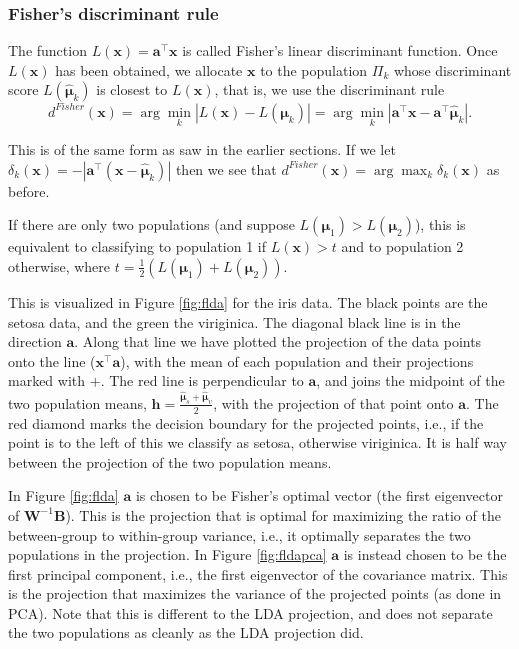 \documentclass[
]{book}
\theoremstyle{definition}
\theoremstyle{definition}
\theoremstyle{definition}
\theoremstyle{definition}
\theoremstyle{remark}
\begin{document}
\hypertarget{fishers-discriminant-rule}{%
\subsubsection*{Fisher's discriminant rule}\label{fishers-discriminant-rule}}

The function \(L(\mathbf x)=\mathbf a^\top \mathbf x\) is called Fisher's linear discriminant function. Once \(L(\mathbf x)\) has been obtained, we allocate \(\mathbf x\) to the population \(\Pi_k\) whose discriminant score \(L(\hat{{\boldsymbol{\mu}}}_k)\) is closest to \(L(\mathbf x)\), that is, we use the discriminant rule \[ d^{Fisher}(\mathbf x) = \arg \min_k |L(\mathbf x) - L({\boldsymbol{\mu}}_k)| = \arg \min_k | \mathbf a^\top \mathbf x- \mathbf a^\top \hat{{\boldsymbol{\mu}}}_k |. \]

This is of the same form as saw in the earlier sections. If we let \(\delta_k(\mathbf x)= -|\mathbf a^\top (\mathbf x-\hat{{\boldsymbol{\mu}}}_k)|\) then we see that
\(d^{Fisher}(\mathbf x) = \arg \max_k \delta_k(\mathbf x)\) as before.

If there are only two populations (and suppose \(L({\boldsymbol{\mu}}_1)> L({\boldsymbol{\mu}}_2)\)), this is equivalent to classifying to population 1 if \(L(\mathbf x)>t\) and to population 2 otherwise, where \(t = \frac{1}{2}(L({\boldsymbol{\mu}}_1)+L({\boldsymbol{\mu}}_2))\).

This is visualized in Figure \ref{fig:flda} for the iris data. The black points are the setosa data, and the green the viriginica. The diagonal black line is in the direction \(\mathbf a\). Along that line we have plotted the projection of the data points onto the line (\(\mathbf x^\top \mathbf a\)), with the mean of each population and their projections marked with \(+\). The red line is perpendicular to \(\mathbf a\), and joins the midpoint of the two population means, \(\mathbf h= \frac{\hat{{\boldsymbol{\mu}}}_s+\hat{{\boldsymbol{\mu}}}_v}{2}\), with the projection of that point onto \(\mathbf a\). The red diamond marks the decision boundary for the projected points, i.e., if the point is to the left of this we classify as setosa, otherwise viriginica. It is half way between the projection of the two population means.

In Figure \ref{fig:flda} \(\mathbf a\) is chosen to be Fisher's optimal vector (the first eigenvector of \(\mathbf W^{-1}\mathbf B\)). This is the projection that is optimal for maximizing the ratio of the between-group to within-group variance, i.e., it optimally separates the two populations in the projection. In Figure \ref{fig:fldapca} \(\mathbf a\) is instead chosen to be the first principal component, i.e., the first eigenvector of the covariance matrix. This is the projection that maximizes the variance of the projected points (as done in PCA). Note that this is different to the LDA projection, and does not separate the two populations as cleanly as the LDA projection did.
\end{document}
